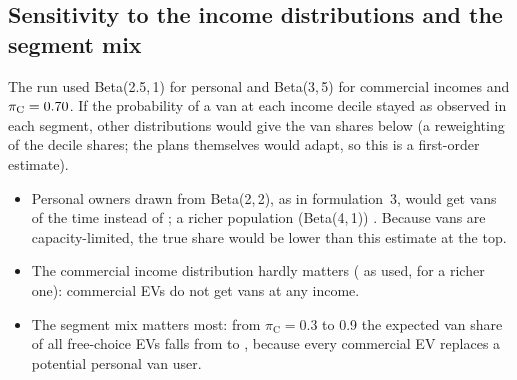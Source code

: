 
\subsection{Sensitivity to the income distributions and the segment mix}
\label{sec:sensitivity}
The run used Beta(2.5,\,1) for personal and Beta(3,\,5) for commercial incomes and $\pi_{\mathrm C}=0.70$. If the probability of a van at each income decile stayed as observed in each segment, other distributions would give the van shares below (a reweighting of the decile shares; the plans themselves would adapt, so this is a first-order estimate).
\begin{table}[H]
\centering\small
\caption{Expected van share of free-choice EVs of a segment under other income distributions.}
\label{tab:beta}

\end{table}
\begin{table}[H]
\centering\small
\caption{Expected van share of all free-choice EVs under other segment mixes (income distributions as used).}
\label{tab:pimix}

\end{table}
\begin{itemize}
  \item Personal owners drawn from Beta(2,\,2), as in formulation~3, would get vans \ExpSharePersFThree\pct{} of the time instead of \ExpSharePersonalUsed\pct; a richer population (Beta(4,\,1)) \ExpSharePersRich\pct. Because vans are capacity-limited, the true share would be lower than this estimate at the top.
  \item The commercial income distribution hardly matters (\ExpShareCommercialUsed\pct{} as used, \ExpShareCommRich\pct{} for a richer one): commercial EVs do not get vans at any income.
  \item The segment mix matters most: from $\pi_{\mathrm C}=0.3$ to 0.9 the expected van share of all free-choice EVs falls from \ExpVanPiThree\pct{} to \ExpVanPiNine\pct, because every commercial EV replaces a potential personal van user.
\end{itemize}


